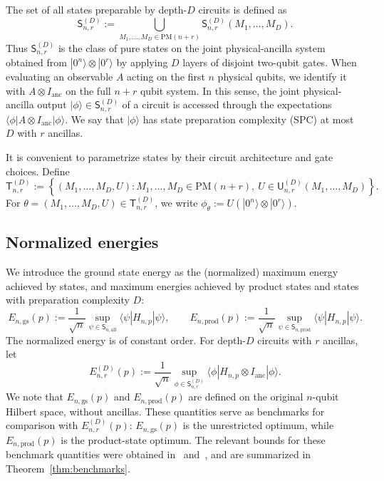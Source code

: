 \documentclass[12pt]{article}
\begin{document}
The set of all  states preparable by depth-\(D\) circuits is
defined as
\[
\mathsf{S}_{n,r}^{(D)}
:=
\bigcup_{M_1,\dots,M_D\in\mathrm{PM}(n+r)}
\mathsf{S}_{n,r}^{(D)}(M_1,\dots,M_D).
\]
Thus \(\mathsf{S}_{n,r}^{(D)}\) is the class of pure states on the joint
physical-ancilla system obtained from
\(|0^n\rangle\otimes |0^r\rangle\) by applying \(D\) layers of disjoint
two-qubit gates. When evaluating an observable \(A\) acting on the first
\(n\) physical qubits, we identify it with \(A\otimes I_{\mathrm{anc}}\) on
the full \(n+r\) qubit system. In this sense, the joint physical-ancilla output 
\(|\phi\rangle\in\mathsf{S}_{n,r}^{(D)}\)
of a circuit
 is accessed through the expectations $\langle \phi|A\otimes I_{\mathrm{anc}}|\phi\rangle $. We say that
 $|\phi\rangle$
  has state preparation complexity (SPC) at most \(D\) with \(r\) ancillas.


It is convenient to parametrize states by their circuit architecture and gate choices. Define
\[
\mathsf{T}_{n,r}^{(D)}
:=
\left\{
(M_1,\dots,M_D,U):
M_1,\dots,M_D\in\mathrm{PM}(n+r),\
U\in\mathsf{U}^{(D)}_{n,r}(M_1,\dots,M_D)
\right\}.
\]
For \(\theta=(M_1,\dots,M_D,U)\in\mathsf{T}_{n,r}^{(D)}\), we write $\phi_\theta := U(|0^n\rangle\otimes |0^r\rangle)$.

\subsection{Normalized energies}
We introduce the ground state energy as the (normalized) maximum energy achieved by states,
and maximum energies achieved by product states and states with preparation complexity
 $D$:
\[
    E_{n,\mathrm{gs}}(p)
    :=
    \frac1{\sqrt n}
    \sup_{\psi\in\mathsf{S}_{n,\mathrm{all}}}
    \langle\psi|H_{n,p}|\psi\rangle,
    \qquad
    E_{n,\mathrm{prod}}(p)
    :=
    \frac1{\sqrt n}
    \sup_{\psi\in\mathsf{S}_{n,\mathrm{prod}}}
    \langle\psi|H_{n,p}|\psi\rangle.
\]
The normalized energy is of constant order. For depth-\(D\) circuits with $r$ ancillas, let
\[
    E_{n,r}^{(D)}(p)
    :=
    \frac1{\sqrt n}
    \sup_{\phi\in\mathsf{S}_{n,r}^{(D)}}
    \langle\phi|
    H_{n,p}\otimes I_{\mathrm{anc}}
    |\phi\rangle .
\]
We note that \(E_{n,\mathrm{gs}}(p)\) and \(E_{n,\mathrm{prod}}(p)\) are
defined on the original \(n\)-qubit Hilbert space, without ancillas. These
quantities serve as benchmarks for comparison with \(E_{n,r}^{(D)}(p)\):
\(E_{n,\mathrm{gs}}(p)\) is the unrestricted optimum, while
\(E_{n,\mathrm{prod}}(p)\) is the product-state optimum. The relevant bounds
for these benchmark quantities were obtained in~\cite{anschuetz2025bounds}
and~\cite{anschuetz2025strongly}, and are summarized in Theorem~\ref{thm:benchmarks}.
\end{document}
